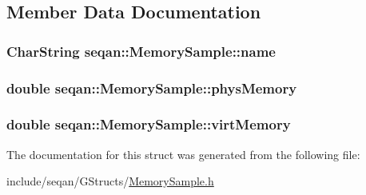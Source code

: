 \subsection{Member Data Documentation}
\hypertarget{structseqan_1_1_memory_sample_ac73b3a108cbef1afe887b007fd691b89}{
\subsubsection[{name}]{\setlength{\rightskip}{0pt plus 5cm}Char\-String seqan\-::\-Memory\-Sample\-::name}}\label{structseqan_1_1_memory_sample_ac73b3a108cbef1afe887b007fd691b89}
\hypertarget{structseqan_1_1_memory_sample_a9e83041889b177e0b3942e9b10492e4a}{
\subsubsection[{phys\-Memory}]{\setlength{\rightskip}{0pt plus 5cm}double seqan\-::\-Memory\-Sample\-::phys\-Memory}}\label{structseqan_1_1_memory_sample_a9e83041889b177e0b3942e9b10492e4a}
\hypertarget{structseqan_1_1_memory_sample_a22b5eb5bbe60a5d9cb9b6cd6d2160412}{
\subsubsection[{virt\-Memory}]{\setlength{\rightskip}{0pt plus 5cm}double seqan\-::\-Memory\-Sample\-::virt\-Memory}}\label{structseqan_1_1_memory_sample_a22b5eb5bbe60a5d9cb9b6cd6d2160412}


The documentation for this struct was generated from the following file\-:\begin{DoxyCompactItemize}
\item 
include/seqan/\-G\-Structs/\hyperlink{_memory_sample_8h}{Memory\-Sample.\-h}\end{DoxyCompactItemize}
